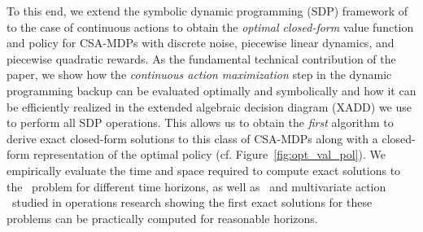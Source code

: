 To this end, we extend the symbolic dynamic programming (SDP) framework
of~\cite{sanner_uai11} to the case of continuous actions to obtain the
\emph{optimal closed-form} value function and policy for CSA-MDPs with
discrete noise, piecewise linear dynamics, and piecewise quadratic
rewards.  As the fundamental technical contribution of the paper, we
show how the \emph{continuous action maximization} step in the dynamic
programming backup can be evaluated optimally and symbolically and how
it can be efficiently realized in the extended algebraic decision diagram (XADD)
we use to perform all SDP operations.  This
allows us to obtain the \emph{first} algorithm to derive exact closed-form
solutions to this class of CSA-MDPs along with a closed-form
representation of the optimal policy
(cf. Figure~\ref{fig:opt_val_pol}).  
We empirically evaluate the time and space required to compute exact
solutions to the \MarsRover\ problem for different time horizons, as
well as \WaterReservoir\ and multivariate action \InventoryControl\
studied in operations research showing the first exact solutions for
these problems can be practically computed for reasonable horizons.
